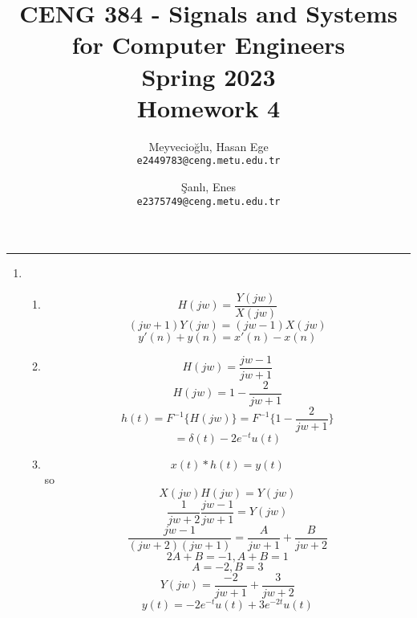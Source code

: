 \documentclass[10pt,a4paper, margin=1in]{article}
\author{
  Meyvecioğlu, Hasan Ege\\
  \texttt{e2449783@ceng.metu.edu.tr}
  \and
  Şanlı, Enes\\
  \texttt{e2375749@ceng.metu.edu.tr}
}
\title{CENG 384 - Signals and Systems for Computer Engineers \\
Spring 2023 \\
Homework 4}
\begin{document}
\maketitle



\noindent\rule{19cm}{1.2pt}

\begin{enumerate}

\item %
	\begin{enumerate}   
    \item %
   \begin{equation}
        H(jw) = \frac{Y(jw)}{X(jw)}
   \end{equation}
   \begin{equation}
       (jw+1)Y(jw) = (jw-1)X(jw)
   \end{equation}
   \begin{equation}
       y'(n) + y(n) = x'(n) - x(n)
   \end{equation}
    \item %
    \begin{equation}
        H(jw) = \frac{jw - 1}{jw +1}        
    \end{equation}
    \begin{equation}
        H(jw) = 1 -\frac{2}{jw + 1}
    \end{equation}
    \begin{equation}
        h(t) = F^{-1}\{H(jw)\} = F^{-1}\{ 1 -\frac{2}{jw + 1}\} 
    \end{equation}
    \begin{equation}
        = \delta(t) - 2e^{-t}u(t)
    \end{equation}
	\item %
    \begin{equation}
        x(t)*h(t) = y(t)
    \end{equation}
    so
    \begin{equation}
        X(jw)H(jw) = Y(jw)
    \end{equation}
    \begin{equation}
        \frac{1}{jw+2}\frac{jw - 1}{ jw +1} = Y(jw)
    \end{equation}
    \begin{equation}
        \frac{jw -1}{(jw+2)(jw+1)} = \frac{A}{jw+1} + \frac{B}{jw+2}
    \end{equation}
    \begin{equation}
        2A+B=-1, A+B = 1
    \end{equation}
    \begin{equation}
        A = -2, B=3 
    \end{equation}
    \begin{equation}
        Y(jw) = \frac{-2}{jw+1} + \frac{3}{jw+2}
    \end{equation}
    \begin{equation}
        y(t) = -2e^{-t}u(t) + 3e^{-2t}u(t)
    \end{equation}


\end{enumerate}
\end{enumerate}
\end{document}
